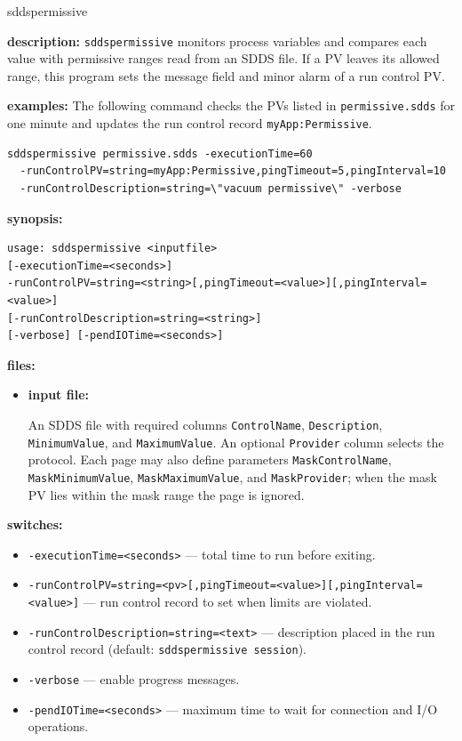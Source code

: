 %
\begin{sddsprog}{sddspermissive}
\item \textbf{description:}
\verb+sddspermissive+ monitors process variables and compares each value with
permissive ranges read from an SDDS file.  If a PV leaves its allowed range,
this program sets the message field and minor alarm of a run control PV.

\item \textbf{examples:}
The following command checks the PVs listed in \verb+permissive.sdds+ for one
minute and updates the run control record \verb+myApp:Permissive+.
\begin{verbatim}
sddspermissive permissive.sdds -executionTime=60
  -runControlPV=string=myApp:Permissive,pingTimeout=5,pingInterval=10
  -runControlDescription=string=\"vacuum permissive\" -verbose
\end{verbatim}

\item \textbf{synopsis:}
\begin{verbatim}
usage: sddspermissive <inputfile>
[-executionTime=<seconds>]
-runControlPV=string=<string>[,pingTimeout=<value>][,pingInterval=<value>]
[-runControlDescription=string=<string>]
[-verbose] [-pendIOTime=<seconds>]
\end{verbatim}

\item \textbf{files:}
\begin{itemize}
  \item \textbf{input file:}\par
An SDDS file with required columns \verb+ControlName+, \verb+Description+,
\verb+MinimumValue+, and \verb+MaximumValue+.  An optional \verb+Provider+
column selects the protocol.  Each page may also define parameters
\verb+MaskControlName+, \verb+MaskMinimumValue+, \verb+MaskMaximumValue+,
and \verb+MaskProvider+; when the mask PV lies within the mask range the page
is ignored.
\end{itemize}

\item \textbf{switches:}
\begin{itemize}
  \item {\tt -executionTime=<seconds>} --- total time to run before exiting.
  \item {\tt -runControlPV=string=<pv>[,pingTimeout=<value>][,pingInterval=<value>]} --- run
  control record to set when limits are violated.
  \item {\tt -runControlDescription=string=<text>} --- description placed in the run
  control record (default: \verb+sddspermissive session+).
  \item {\tt -verbose} --- enable progress messages.
  \item {\tt -pendIOTime=<seconds>} --- maximum time to wait for connection and I/O operations.
\end{itemize}


\end{sddsprog}
